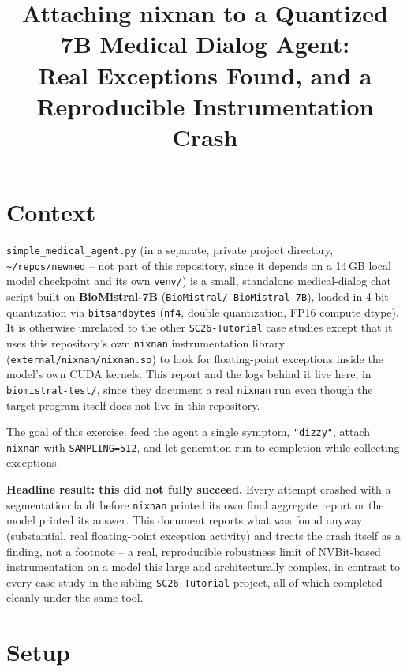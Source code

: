 \documentclass[11pt]{article}
\title{Attaching nixnan to a Quantized 7B Medical Dialog Agent:\\
Real Exceptions Found, and a Reproducible Instrumentation Crash}
\author{}
\date{}
\begin{document}
\maketitle

\section{Context}

\texttt{simple\_medical\_agent.py} (in a separate, private project
directory, \texttt{\textasciitilde/repos/newmed} -- not part of this
repository, since it depends on a 14\,GB local model checkpoint and its
own \texttt{venv/}) is a small, standalone medical-dialog chat script
built on \textbf{BioMistral-7B} (\texttt{BioMistral/\allowbreak
BioMistral-7B}), loaded in 4-bit quantization via \texttt{bitsandbytes}
(\texttt{nf4}, double quantization, FP16 compute dtype). It is otherwise
unrelated to the other \texttt{SC26-Tutorial} case studies except that it
uses this repository's own \texttt{nixnan} instrumentation library
(\texttt{external/nixnan/nixnan.so}) to look for floating-point
exceptions inside the model's own CUDA kernels. This report and the logs
behind it live here, in \texttt{biomistral-test/}, since they document a
real \texttt{nixnan} run even though the target program itself does not
live in this repository.

The goal of this exercise: feed the agent a single symptom, \texttt{"dizzy"},
attach \texttt{nixnan} with \texttt{SAMPLING=512}, and let generation run to
completion while collecting exceptions.

\textbf{Headline result: this did not fully succeed.} Every attempt crashed
with a segmentation fault before \texttt{nixnan} printed its own final
aggregate report or the model printed its answer. This document reports
what was found anyway (substantial, real floating-point exception activity)
and treats the crash itself as a finding, not a footnote -- a real,
reproducible robustness limit of NVBit-based instrumentation on a model
this large and architecturally complex, in contrast to every case study in
the sibling \texttt{SC26-Tutorial} project, all of which completed cleanly
under the same tool.

\section{Setup}
\end{document}
